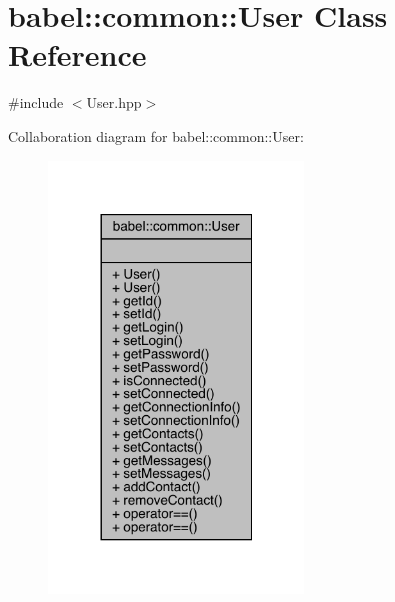 \hypertarget{classbabel_1_1common_1_1_user}{}\section{babel\+:\+:common\+:\+:User Class Reference}
\label{classbabel_1_1common_1_1_user}


{\ttfamily \#include $<$User.\+hpp$>$}



Collaboration diagram for babel\+:\+:common\+:\+:User\+:\nopagebreak
\begin{figure}[H]
\begin{center}
\leavevmode
\includegraphics[width=192pt]{classbabel_1_1common_1_1_user__coll__graph}
\end{center}
\end{figure}
